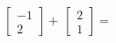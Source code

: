 \documentclass[preview]{standalone}
\begin{document}
\begin{align*}
\begin{bmatrix}-1\\2\end{bmatrix}+\
                \begin{bmatrix}2\\1\end{bmatrix}=\\
\end{align*}
\end{document}
